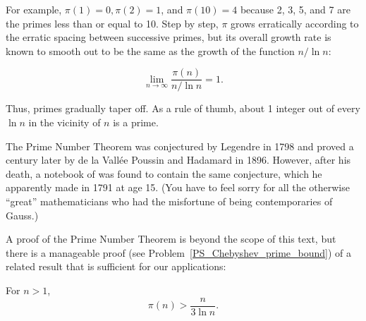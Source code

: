 For example, $\pi(1) = 0, \pi(2) = 1$, and $\pi(10) = 4$ because 2, 3,
5, and 7 are the primes less than or equal to 10.  Step by step,
$\pi$ grows erratically according to the erratic spacing between
successive primes, but its overall growth rate is known to smooth out
to be the same as the growth of the function $n/\ln n$:

\begin{theorem}%
\[
\lim_{n\to\infty} \frac{\pi(n)}{n/\ln n} = 1.
\]
\end{theorem}

Thus, primes gradually taper off.  As a rule of thumb, about 1 integer
out of every $\ln n$ in the vicinity of $n$ is a prime.


The Prime Number Theorem was conjectured by Legendre in 1798 and
proved a century later by de la Vall\'{e}e Poussin and Hadamard in 1896.
However, after his death, a notebook of  was found to contain the
same conjecture, which he apparently made in 1791 at age 15.  (You
have to feel sorry for all the otherwise ``great'' mathematicians who
had the misfortune of being contemporaries of Gauss.)

A proof of the Prime Number Theorem is beyond the scope of this text,
but there is a manageable proof (see
Problem~\ref{PS_Chebyshev_prime_bound}) of a related result that is
sufficient for our applications:
\begin{theorem}
For $n >1$,
\[
\pi(n) > \frac{n}{3 \ln n}.
\]
\end{theorem}

